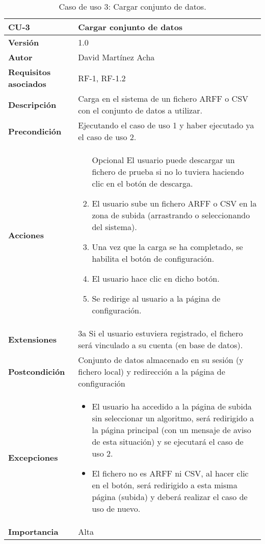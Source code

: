 \begin{table}[p]
	\centering
	\begin{tabularx}{\linewidth}{ p{} p{} }
		\toprule
		\textbf{CU-3}    & \textbf{Cargar conjunto de datos}\\
		\toprule
		\textbf{Versión}              & 1.0    \\
		\textbf{Autor}                & David Martínez Acha \\
		\textbf{Requisitos asociados} & RF-1, RF-1.2 \\
		\textbf{Descripción}          & Carga en el sistema de un fichero ARFF o CSV con el conjunto de datos a utilizar. \\
		\textbf{Precondición}         & Ejecutando el caso de uso 1 y haber ejecutado ya el caso de uso 2.\\
		\textbf{Acciones}             &
		\begin{enumerate}
			\def\labelenumi{\arabic{enumi}.}
			\tightlist
			\item [Opcional] El usuario puede descargar un fichero de prueba si no lo tuviera haciendo clic en el botón de descarga.
			\item El usuario sube un fichero ARFF o CSV en la zona de subida (arrastrando o seleccionando del sistema).
			\item Una vez que la carga se ha completado, se habilita el botón de configuración.
			\item El usuario hace clic en dicho botón.
			\item Se redirige al usuario a la página de configuración.
		\end{enumerate}\\
		\textbf{Extensiones}          & 3a Si el usuario estuviera registrado, el fichero será vinculado a su cuenta (en base de datos). \\
		\textbf{Postcondición}        & Conjunto de datos almacenado en su sesión (y fichero local) y redirección a la página de configuración \\
		\textbf{Excepciones}          & \begin{itemize}
			\item El usuario ha accedido a la página de subida sin seleccionar un algoritmo, será redirigido a la página principal (con un mensaje de aviso de esta situación) y se ejecutará el caso de uso 2.
			\item El fichero no es ARFF ni CSV, al hacer clic en el botón, será redirigido a esta misma página (subida) y deberá realizar el caso de uso de nuevo.
		\end{itemize} \\
		\textbf{Importancia}          & Alta \\
		\bottomrule
	\end{tabularx}
	\caption{Caso de uso 3: Cargar conjunto de datos.}
\end{table}

